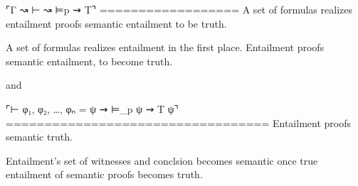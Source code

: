 ⌜Γ ↝ ⊢ ↝ ⊨p ⇝ T⌝ 
==================
A set of formulas realizes entailment proofs semantic entailment to be truth.

A set of formulas realizes entailment in the first place. Entailment proofs semantic entailment, to become truth.

and

⌜⊢ φ₁, φ₂, …, φₙ = ψ ⇝ ⊨_p ψ ⇝ T ψ⌝
==================================
Entailment proofs semantic truth. 

Entailment's set of witnesses and conclsion becomes semantic once true entailment of semantic proofs becomes truth.
